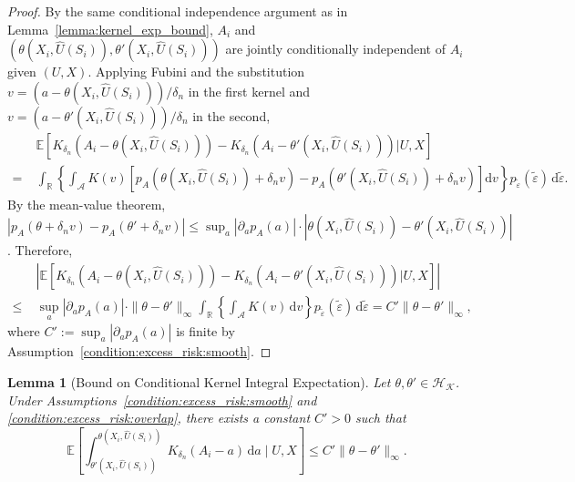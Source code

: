 \documentclass[12pt]{article}
\newtheorem{lemma}{Lemma}%
\newcommand{\E}{\mathbb{E}}
\newcommand{\R}{\mathbb{R}}
\begin{document}
\begin{proof}
By the same conditional independence argument as in Lemma~\ref{lemma:kernel_exp_bound}, $A_i$ and $(\theta(X_i,\widehat{U}(S_i)),\theta'(X_i,\widehat{U}(S_i)))$ are jointly conditionally independent of $A_i$ given $(U,X)$.  Applying Fubini and the substitution $v=(a-\theta(X_i,\widehat{U}(S_i)))/\delta_n$ in the first kernel and $v=(a-\theta'(X_i,\widehat{U}(S_i)))/\delta_n$ in the second,
\begin{align*}
&\E\!\left[K_{\delta_n}\!\left(A_i-\theta(X_i,\widehat{U}(S_i))\right) - K_{\delta_n}\!\left(A_i-\theta'(X_i,\widehat{U}(S_i))\right)\bigg|U,X\right]\\
= \;&\int_{\R}\left\{\int_{\mathcal{A}}K(v)\!\left[p_A\!\left(\theta(X_i,\widehat{U}(S_i))+\delta_n v\right) - p_A\!\left(\theta'(X_i,\widehat{U}(S_i))+\delta_n v\right)\right]\mathrm{d}v\right\}p_{\tilde\varepsilon}(\tilde\varepsilon)\,\mathrm{d}\tilde\varepsilon.
\end{align*}
By the mean-value theorem, $|p_A(\theta+\delta_n v) - p_A(\theta'+\delta_n v)|\leq \sup_a|\partial_a p_A(a)|\cdot|\theta(X_i,\widehat{U}(S_i))-\theta'(X_i,\widehat{U}(S_i))|$.  Therefore,
\begin{align*}
&\left|\E\!\left[K_{\delta_n}(A_i-\theta(X_i,\widehat{U}(S_i))) - K_{\delta_n}(A_i-\theta'(X_i,\widehat{U}(S_i)))\bigg|U,X\right]\right|\\
\leq\;& \sup_a|\partial_a p_A(a)|\cdot\|\theta-\theta'\|_\infty \int_{\R}\left\{\int_{\mathcal{A}}K(v)\,\mathrm{d}v\right\}p_{\tilde\varepsilon}(\tilde\varepsilon)\,\mathrm{d}\tilde\varepsilon = C'\|\theta-\theta'\|_\infty,
\end{align*}
where $C' := \sup_a|\partial_a p_A(a)|$ is finite by Assumption~\ref{condition:excess_risk:smooth}.
\end{proof}

\begin{lemma}[Bound on Conditional Kernel Integral Expectation]\label{lemma:kernel_int_exp_bound}
Let $\theta,\theta'\in\mathcal{H}_\mathcal{K}$.  Under Assumptions~\ref{condition:excess_risk:smooth} and \ref{condition:excess_risk:overlap}, there exists a constant $C'>0$ such that
$$\E\!\left[\int_{\theta'(X_i,\widehat{U}(S_i))}^{\theta(X_i,\widehat{U}(S_i))}K_{\delta_n}(A_i-a)\,\mathrm{d}a\;\Bigg|\;U,X\right] \leq C'\|\theta-\theta'\|_\infty.$$
\end{lemma}
\end{document}
